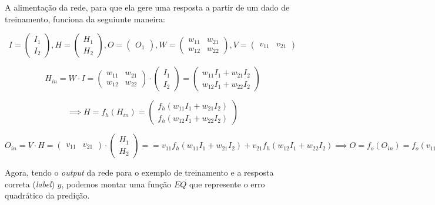 \documentclass{article}
\begin{document}
A alimentação da rede, para que ela gere uma resposta a partir de um dado de treinamento, funciona da seguiunte maneira:

$$
    I = \begin{pmatrix}I_1\\I_2\end{pmatrix}, H = \begin{pmatrix}H_1\\H_2\end{pmatrix}, O = \begin{pmatrix}O_1\end{pmatrix}, 
    W = \begin{pmatrix}w_{11}&w_{21}\\w_{12}&w_{22}\end{pmatrix}, V = \begin{pmatrix}v_{11}&v_{21}\end{pmatrix}
$$

$$
    H_{in} = W \cdot I = \begin{pmatrix}w_{11}&w_{21}\\w_{12}&w_{22}\end{pmatrix} \cdot \begin{pmatrix}I_1\\I_{2}\end{pmatrix} = \begin{pmatrix}w_{11}I_1 + w_{21}I_2 \\ w_{12}I_1 + w_{22}I_2 \end{pmatrix}
$$   

$$
    \implies H = f_h(H_{in})=\begin{pmatrix}f_h(w_{11}I_1 + w_{21}I_2) \\ f_h(w_{12}I_1 + w_{22}I_2) \end{pmatrix}
$$    

$$  
    O_{in} = V \cdot H = \begin{pmatrix}v_{11}&v_{21}\end{pmatrix} \cdot \begin{pmatrix}H_1\\H_2\end{pmatrix} =  
    = v_{11}f_h(w_{11}I_1 + w_{21}I_2) + v_{21}f_h(w_{12}I_1 + w_{22}I_2)
    \implies O = f_o(O_{in}) = f_o(v_{11}f_h(w_{11}I_1 + w_{21}I_2) + v_{21}f_h(w_{12}I_1 + w_{22}I_2))
$$


Agora, tendo o \textit{output} da rede para o exemplo de treinamento e a resposta correta (\textit{label}) $y$, podemos montar uma função $EQ$ que represente o erro quadrático da predição.
\end{document}
